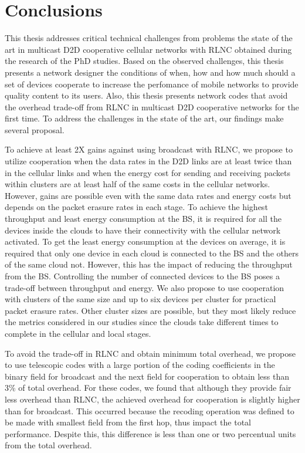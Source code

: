 \section{Conclusions}\label{sec:conclusion}

This thesis addresses critical technical challenges from problems the state of the art in multicast \ac{D2D} cooperative cellular networks with \ac{RLNC} obtained during the research of the PhD studies. Based on the observed challenges, this thesis presents a network designer the conditions of when, how and how much should a set of devices cooperate to increase the perfomance of mobile networks to provide quality content to its users. Also, this thesis presents network codes that avoid the overhead trade-off from \ac{RLNC} in multicast \ac{D2D} cooperative networks for the first time. To address the challenges in the state of the art, our findings make several proposal.

To achieve at least 2X gains against using broadcast with \ac{RLNC}, we propose to utilize cooperation when the data rates in the \ac{D2D} links are at least twice than in the cellular links and when the energy cost for sending and receiving packets within clusters are at least half of the same costs in the cellular networks. However, gains are possible even with the same data rates and energy costs but depends on the packet erasure rates in each stage. To achieve the highest throughput and least energy consumption at the \ac{BS}, it is required for all the devices inside the clouds to have their connectivity with the cellular network activated. To get the least energy consumption at the devices on average, it is required that only one device in each cloud is connected to the \ac{BS} and the others of the same cloud not. However, this has the impact of reducing the throughput from the \ac{BS}. Controlling the number of connected devices to the \ac{BS} poses a trade-off between throughput and energy. We also propose to use cooperation with clusters of the same size and up to six devices per cluster for practical packet erasure rates. Other cluster sizes are possible, but they most likely reduce the metrics considered in our studies since the clouds take different times to complete in the cellular and local stages.

To avoid the trade-off in \ac{RLNC} and obtain minimum total overhead, we propose to use telescopic codes with a large portion of the coding coefficients in the binary field for broadcast and the next field for cooperation to obtain less than 3\% of total overhead. For these codes, we found that although they provide fair less overhead than \ac{RLNC}, the achieved overhead for cooperation is slightly higher than for broadcast. This occurred because the recoding operation was defined to be made with smallest field from the first hop, thus impact the total performance. Despite this, this difference is less than one or two percentual units from the total overhead.

